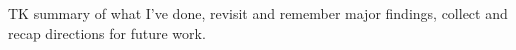 TK summary of what I've done, revisit and remember major findings, collect and recap directions for future work.
